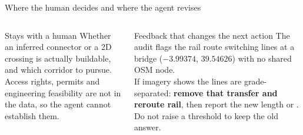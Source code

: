 \documentclass[aspectratio=169,11pt]{beamer}
\newcommand{\tl}[1]{\texttt{\detokenize{#1}}}
\begin{document}
\begin{frame}{Where the human decides and where the agent revises}
\small
\begin{columns}[T,onlytextwidth]
\begin{block}{Stays with a human}
Whether an inferred connector or a 2D crossing is actually buildable, and which corridor to pursue.\\[4pt]
Access rights, permits and engineering feasibility are not in the data, so the agent cannot establish them.
\end{block}
\begin{block}{Feedback that changes the next action}
The audit flags the rail route switching lines at a bridge ($-3.99374$, $39.54626$) with no shared OSM node.\\[4pt]
If imagery shows the lines are grade-separated: \textbf{remove that transfer and reroute rail}, then report the new length or \tl{no_path}. Do not raise a threshold to keep the old answer.
\end{block}
\end{columns}
\end{frame}
\end{document}
